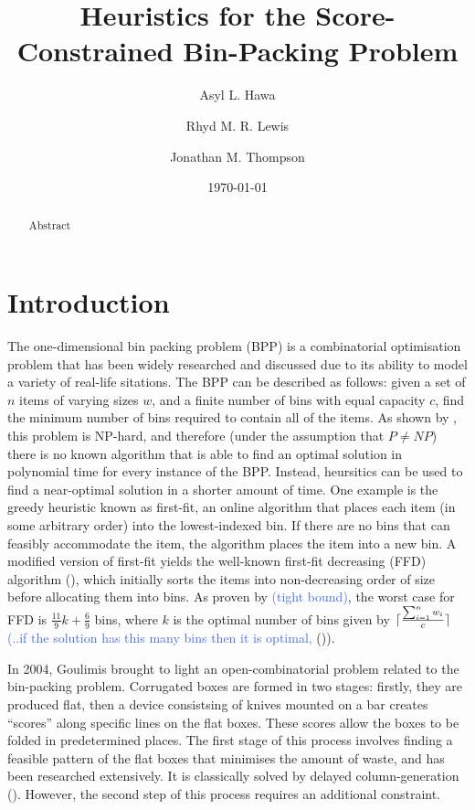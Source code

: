 \documentclass[oribibl]{llncs}
\title{Heuristics for the Score-Constrained Bin-Packing Problem}
\author{Asyl L. Hawa \and Rhyd M. R. Lewis \and Jonathan M. Thompson}
\institute{School of Mathematics, Cardiff University, Senghennydd Road, Cardiff, UK, CF24 4AG}
\date{\today}
\begin{document}
\maketitle

\begin{abstract}
	Abstract
\end{abstract}


\section{Introduction}
\label{sec:intro}

The one-dimensional bin packing problem (BPP) is a combinatorial optimisation problem that has been widely researched and discussed due to its ability to model a variety of real-life sitations.
The BPP can be described as follows: given a set of $n$ items of varying sizes $w$, and a finite number of bins with equal capacity $c$, find the minimum number of bins required to contain all of the items. As shown by \cite{garey1979}, this problem is NP-hard, and therefore (under the assumption that $P \neq NP$) there is no known algorithm that is able to find an optimal solution in polynomial time for every instance of the BPP. Instead, heursitics can be used to find a near-optimal solution in a shorter amount of time. One example is the greedy heuristic known as first-fit, an online algorithm that places each item (in some arbitrary order) into the lowest-indexed bin. If there are no bins that can feasibly accommodate the item, the algorithm places the item into a new bin. A modified version of first-fit yields the well-known first-fit decreasing (FFD) algorithm (\citealp{eilon1971}), which initially sorts the items into non-decreasing order of size before allocating them into bins. As proven by \cite{dosa2007} \textcolor{RoyalBlue}{(tight bound)}, the worst case for FFD is $\frac{11}{9}k + \frac{6}{9}$ bins, where $k$ is the optimal number of bins given by $\lceil\frac{\sum_{i=1}^{n} w_{i}}{c}\rceil$ \textcolor{RoyalBlue}{(..if the solution has this many bins then it is optimal,} (\citealp{korf2002})).

In 2004, Goulimis brought to light an open-combinatorial problem related to the bin-packing problem. Corrugated boxes are formed in two stages: firstly, they are produced flat, then a device consistsing of knives mounted on a bar creates ``scores'' along specific lines on the flat boxes. These scores allow the boxes to be folded in predetermined places. The first stage of this process involves finding a feasible pattern of the flat boxes that minimises the amount of waste, and has been researched extensively. It is classically solved by delayed column-generation (\citealp{gilmore1961, gilmore1963}). However, the second step of this process requires an additional constraint.
\end{document}
